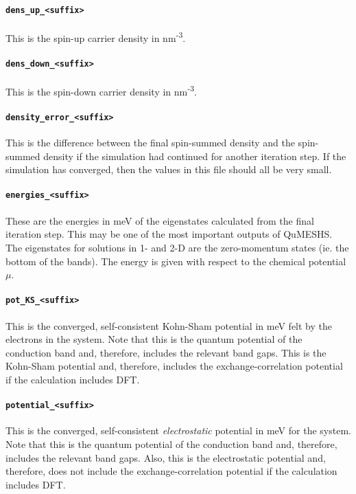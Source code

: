 \documentclass[12pt]{article}
\begin{document}
\paragraph{\texttt{dens\_up\_<suffix>}}
This is the spin-up carrier density in nm\textsuperscript{-3}.

\paragraph{\texttt{dens\_down\_<suffix>}}
This is the spin-down carrier density in nm\textsuperscript{-3}.

\paragraph{\texttt{density\_error\_<suffix>}}
This is the difference between the final spin-summed density and the spin-summed density
if the simulation had continued for another iteration step.  If the simulation has
converged, then the values in this file should all be very small.

\paragraph{\texttt{energies\_<suffix>}}
These are the energies in meV of the eigenstates calculated from the final iteration step.
This may be one of the most important outputs of QuMESHS.  The eigenstates for solutions
in 1- and 2-D are the zero-momentum states (ie. the bottom of the bands).  The energy is
given with respect to the chemical potential $\mu$.

\paragraph{\texttt{pot\_KS\_<suffix>}}
This is the converged, self-consistent Kohn-Sham potential in meV felt by the electrons in
the system.  Note that this is the quantum potential of the conduction band and, therefore,
includes the relevant band gaps.  This is the Kohn-Sham potential and, therefore, includes
the exchange-correlation potential if the calculation includes DFT.

\paragraph{\texttt{potential\_<suffix>}}
This is the converged, self-consistent \emph{\color{red} electrostatic} potential in meV
for the system.  Note that this is the quantum potential of the conduction band and,
therefore, includes the relevant band gaps.  Also, this is the electrostatic potential
and, therefore, does not include the exchange-correlation potential if the calculation
includes DFT.
\end{document}
